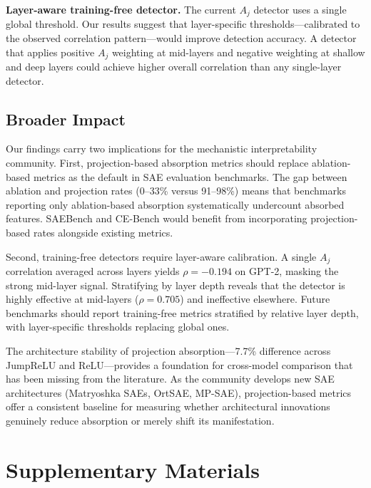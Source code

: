 \documentclass{article}
\begin{document}
\textbf{Layer-aware training-free detector.} The current $A_j$ detector uses a single global threshold. Our results suggest that layer-specific thresholds---calibrated to the observed correlation pattern---would improve detection accuracy. A detector that applies positive $A_j$ weighting at mid-layers and negative weighting at shallow and deep layers could achieve higher overall correlation than any single-layer detector.

\subsection{Broader Impact}

Our findings carry two implications for the mechanistic interpretability community. First, projection-based absorption metrics should replace ablation-based metrics as the default in SAE evaluation benchmarks. The gap between ablation and projection rates (0--33\% versus 91--98\%) means that benchmarks reporting only ablation-based absorption systematically undercount absorbed features. SAEBench \citep{karvonen2025saebench} and CE-Bench \citep{peng2025cebench} would benefit from incorporating projection-based rates alongside existing metrics.

Second, training-free detectors require layer-aware calibration. A single $A_j$ correlation averaged across layers yields $\rho = -0.194$ on GPT-2, masking the strong mid-layer signal. Stratifying by layer depth reveals that the detector is highly effective at mid-layers ($\rho = 0.705$) and ineffective elsewhere. Future benchmarks should report training-free metrics stratified by relative layer depth, with layer-specific thresholds replacing global ones.

The architecture stability of projection absorption---7.7\% difference across JumpReLU and ReLU---provides a foundation for cross-model comparison that has been missing from the literature. As the community develops new SAE architectures (Matryoshka SAEs, OrtSAE, MP-SAE), projection-based metrics offer a consistent baseline for measuring whether architectural innovations genuinely reduce absorption or merely shift its manifestation.




\appendix

\section{Supplementary Materials}
\label{app:supp}
\end{document}

